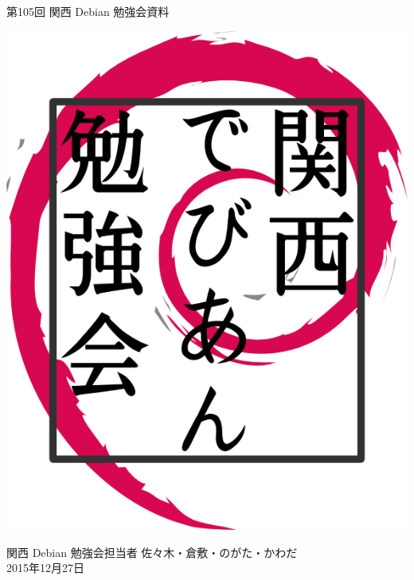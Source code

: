 \documentclass[mingoth,a4paper]{jsarticle}
\newcommand{\debmtgyear}{2015}
\newcommand{\debmtgdate}{27}
\newcommand{\debmtgmonth}{12}
\newcommand{\debmtgnumber}{105}
\begin{document}
\begin{titlepage}


 第\debmtgnumber{}回 関西 Debian 勉強会資料

\vspace{2cm}

\begin{center}
\includegraphics{image200802/kansaidebianlogo.png}
\end{center}

\begin{flushright}
\hfill{}関西 Debian 勉強会担当者 佐々木・倉敷・のがた・かわだ \\
\hfill{}\debmtgyear{}年\debmtgmonth{}月\debmtgdate{}日
\end{flushright}

\thispagestyle{empty}
\end{titlepage}


\vspace{1em}
\end{document}

